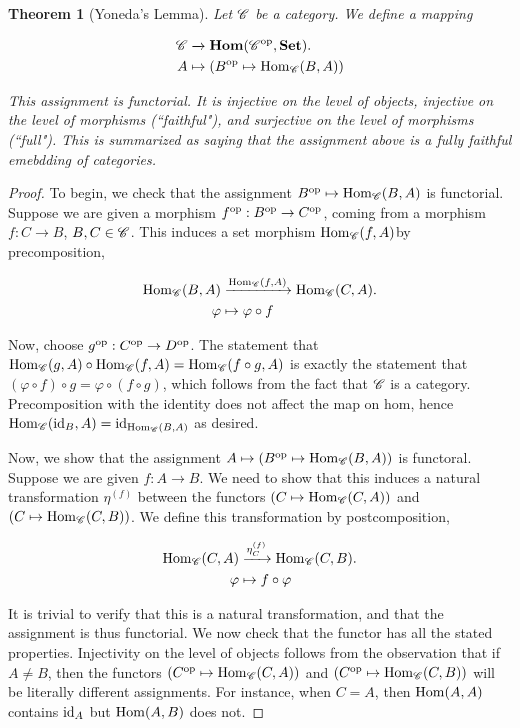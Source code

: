 \documentclass{article}
\newtheorem{theorem}{Theorem}[section]
\theoremstyle{definition}
\numberwithin{figure}{section}
\begin{document}
\begin{theorem}[Yoneda's Lemma] Let $\mathscr{C}$ be a category. We define a mapping

\begin{align*}
\mathscr{C} &\xrightarrow{} \bold{Hom}(\mathscr{C}^{\mathrm{op}},\bold{Set}).\\
A & \mapsto (B^{\mathrm{op}} \mapsto \mathrm{Hom}_{\mathscr{C}}(B,A))
\end{align*}

This assignment is functorial. It is injective on the level of objects, injective on the level of morphisms (``faithful"), and surjective on the level of morphisms (``full"). This is summarized as saying that the assignment above is a fully faithful emebdding of categories.
\end{theorem}
\begin{proof} To begin, we check that the assignment $B^{\mathrm{op}}\mapsto \mathrm{Hom}_{\mathscr{C}}(B,A)$ is functorial. Suppose we are given a morphism $f^{\mathrm{op}}:B^{\mathrm{op}}\to C^{\mathrm{op}}$, coming from a morphism $f:C\to B$, $B,C\in \mathscr{C}$. This induces a set morphism $\mathrm{Hom}_{\mathscr{C}}(f,A)$by precomposition,

\begin{align*}
\mathrm{Hom}_{\mathscr{C}}(B,A)&\xrightarrow{\mathrm{Hom}_{\mathscr{C}}(f,A)} \mathrm{Hom}_{\mathscr{C}}(C,A).\\
\varphi &\mapsto \varphi \circ f
\end{align*}

Now, choose $g^{\mathrm{op}}:C^{\mathrm{op}}\to D^{\mathrm{op}}$. The statement that $\mathrm{Hom}_{\mathscr{C}}(g,A)\circ \mathrm{Hom}_{\mathscr{C}}(f,A)=\mathrm{Hom}_{\mathscr{C}}(f\circ g, A)$ is exactly the statement that $(\varphi \circ f)\circ g =\varphi \circ (f\circ g)$, which follows from the fact that $\mathscr{C}$ is a category. Precomposition with the identity does not affect the map on hom, hence $\mathrm{Hom}_{\mathscr{C}}(\mathrm{id}_{B},A)=\mathrm{id}_{\mathrm{Hom}_{\mathscr{C}}(B,A)}$ as desired.

Now, we show that the assignment $A\mapsto (B^{\mathrm{op}}\mapsto \mathrm{Hom}_{\mathscr{C}}(B,A))$ is functoral. Suppose we are given $f:A\to B$. We need to show that this induces a natural transformation $\eta^{(f)}$ between the functors $\left(C\mapsto \mathrm{Hom}_{\mathscr{C}}(C,A)\right)$ and $\left(C\mapsto \mathrm{Hom}_{\mathscr{C}}(C,B)\right)$. We define this transformation by postcomposition,

\begin{align*}
\mathrm{Hom}_{\mathscr{C}}(C,A)&\xrightarrow{\eta^{(f)}_C}\mathrm{Hom}_{\mathscr{C}}(C,B).\\
\varphi& \mapsto f\circ \varphi
\end{align*}

It is trivial to verify that this is a natural transformation, and that the assignment is thus functorial. We now check that the functor has all the stated properties. Injectivity on the level of objects follows from the observation that if $A\neq B$, then the functors $(C^{\mathrm{op}}\mapsto \mathrm{Hom}_{\mathscr{C}}(C,A))$ and $(C^{\mathrm{op}}\mapsto \mathrm{Hom}_{\mathscr{C}}(C,B))$ will be literally different assignments. For instance, when $C=A$, then $\mathrm{Hom}(A,A)$ contains $\mathrm{id}_A$ but $\mathrm{Hom}(A,B)$ does not.


\end{proof}
\end{document}

